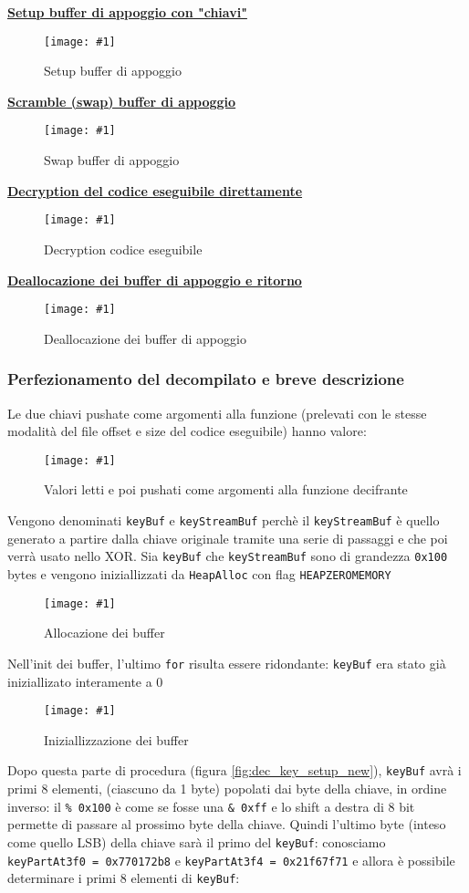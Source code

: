 \documentclass[
    a4paper, %
    11pt %
]{article}
\newcommand{\pic}[4]{\begin{figure}[H]
            \centering
            \texttt{[image: \#1]}
            \caption{#2}
            \label{fig:#1}
            \end{figure}}
\begin{document}
            \textbf{\underline{Setup buffer di appoggio con "chiavi"}}
            \pic{dec_key_setup}{Setup buffer di appoggio}{11cm}{4cm}

            \textbf{\underline{Scramble (swap) buffer di appoggio}}
            \pic{dec_key_swap}{Swap buffer di appoggio}{15cm}{3cm}

            \textbf{\underline{Decryption del codice eseguibile direttamente}}
            \pic{dec_decrypt_inplace}{Decryption codice eseguibile}{14cm}{5cm}

            \textbf{\underline{Deallocazione dei buffer di appoggio e ritorno}}
            \pic{dec_cleanup}{Deallocazione dei buffer di appoggio}{10cm}{3.5cm}

            \subsubsection{Perfezionamento del decompilato e breve descrizione}

            Le due chiavi pushate come argomenti alla funzione (prelevati con le stesse modalità del file
            offset e size del codice eseguibile) hanno valore:

            \pic{keypartreads}{Valori letti e poi pushati come argomenti alla funzione decifrante}
            {12cm}{3cm}

            Vengono denominati \texttt{keyBuf} e \texttt{keyStreamBuf} perchè il \texttt{keyStreamBuf}
            è quello generato a partire dalla chiave originale tramite una serie di passaggi e che poi 
            verrà usato nello XOR. Sia \texttt{keyBuf} che \texttt{keyStreamBuf} sono di grandezza 
            \texttt{0x100} bytes e vengono iniziallizzati da \texttt{HeapAlloc} con flag 
            \texttt{HEAP\textunderscore ZERO\textunderscore MEMORY}
            \pic{dec_allocbufs_new}{Allocazione dei buffer}{13cm}{5cm}

            \pagebreak
            
            Nell'init dei buffer, l'ultimo \texttt{for} risulta essere ridondante: \texttt{keyBuf}
            era stato già iniziallizato interamente a 0
            \pic{dec_init_new}{Iniziallizzazione dei buffer}{15cm}{7cm}

            Dopo questa parte di procedura (figura \ref{fig:dec_key_setup_new}), \texttt{keyBuf} avrà i primi 8 elementi, (ciascuno da 1 byte)
            popolati dai byte della chiave, in ordine inverso: il \texttt{\% 0x100} è come se fosse una \texttt{\& 
            0xff} e lo shift a destra di 8 bit permette di passare al prossimo byte della chiave.
            Quindi l'ultimo byte (inteso come quello LSB) della chiave sarà il primo del \texttt{keyBuf}:
            conosciamo \texttt{keyPartAt3f0 = 0x770172b8} e \texttt{keyPartAt3f4 = 0x21f67f71} e allora
            è possibile determinare i primi 8 elementi di \texttt{keyBuf}:
\end{document}
